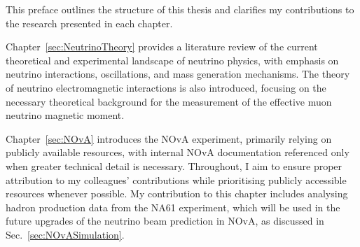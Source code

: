 \label{sec:Preface}

This preface outlines the structure of this thesis and clarifies my contributions to the research presented in each chapter.


Chapter~\ref{sec:NeutrinoTheory} provides a literature review of the current theoretical and experimental landscape of neutrino physics, with emphasis on neutrino interactions, oscillations, and mass generation mechanisms. The theory of neutrino electromagnetic interactions is also introduced, focusing on the necessary theoretical background for the measurement of the effective muon neutrino magnetic moment.

Chapter~\ref{sec:NOvA} introduces the NOvA experiment, primarily relying on publicly available resources, with internal NOvA documentation referenced only when greater technical detail is necessary. Throughout, I aim to ensure proper attribution to my colleagues' contributions while prioritising publicly accessible resources whenever possible. My contribution to this chapter includes analysing hadron production data from the NA61 experiment, which will be used in the future upgrades of the neutrino beam prediction in NOvA, as discussed in Sec.~\ref{sec:NOvASimulation}.%

